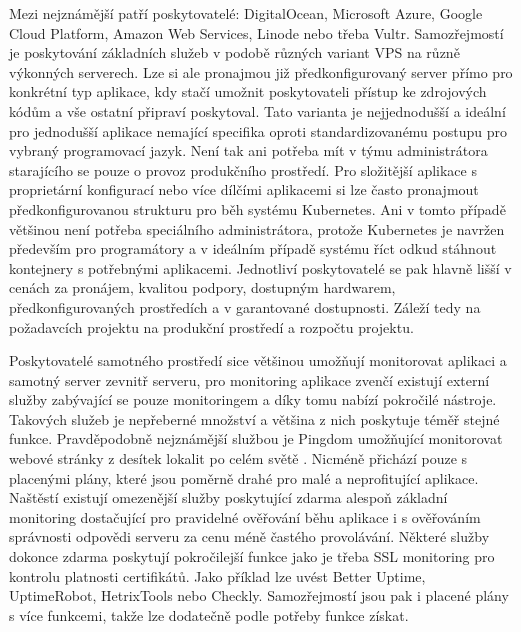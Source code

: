 		Mezi nejznámější patří poskytovatelé: DigitalOcean, Microsoft Azure, Google Cloud Platform, Amazon Web Services,
		Linode nebo třeba Vultr. %
		Samozřejmostí je poskytování základních služeb v podobě různých variant \noindent\Ac{VPS} na různě výkonných serverech.
		Lze si ale pronajmou již předkonfigurovaný server přímo pro konkrétní typ aplikace, kdy stačí umožnit poskytovateli
		přístup ke zdrojových kódům a vše ostatní připraví poskytoval.
		Tato varianta je nejjednodušší a ideální pro jednodušší aplikace nemající specifika oproti standardizovanému postupu
		pro vybraný programovací jazyk.
		Není tak ani potřeba mít v týmu administrátora starajícího se pouze o provoz produkčního prostředí.
		Pro složitější aplikace s proprietární konfigurací nebo více dílčími aplikacemi si lze často pronajmout
		předkonfigurovanou strukturu pro běh systému Kubernetes.
		Ani v tomto případě většinou není potřeba speciálního administrátora, protože Kubernetes je navržen především
		pro programátory a v ideálním případě systému říct odkud stáhnout kontejnery s potřebnými aplikacemi.
		Jednotliví poskytovatelé se pak hlavně lišší v cenách za pronájem, kvalitou podpory, dostupným hardwarem, předkonfigurovaných
		prostředích a v garantované dostupnosti.
		Záleží tedy na požadavcích projektu na produkční prostředí a rozpočtu projektu.

		Poskytovatelé samotného prostředí sice většinou umožňují monitorovat aplikaci a samotný server zevnitř serveru,
		pro monitoring aplikace zvenčí existují externí služby zabývající se pouze monitoringem a díky tomu nabízí pokročilé nástroje.
		Takových služeb je nepřeberné množství a většina z nich poskytuje téměř stejné funkce.
		Pravděpodobně nejznámější službou je Pingdom umožňující monitorovat webové stránky z desítek lokalit po celém
		světě \cite{pingdom}.
		Nicméně přichází pouze s placenými plány, které jsou poměrně drahé pro malé a neprofitující aplikace.
		Naštěstí existují omezenější služby poskytující zdarma alespoň základní monitoring dostačující pro pravidelné
		ověřování běhu aplikace i s ověřováním správnosti odpovědi serveru za cenu méně častého provolávání.
		Některé služby dokonce zdarma poskytují pokročilejší funkce jako je třeba SSL monitoring pro kontrolu
		platnosti certifikátů.
		Jako příklad lze uvést Better Uptime, UptimeRobot, HetrixTools nebo Checkly.
		Samozřejmostí jsou pak i placené plány s více funkcemi, takže lze dodatečně podle potřeby funkce získat.

